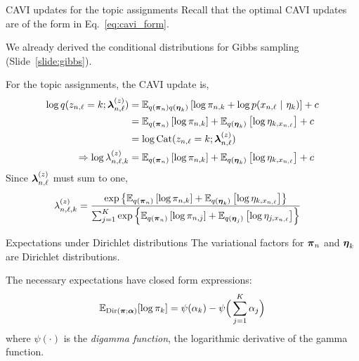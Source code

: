 \documentclass[aspectratio=169]{beamer}
\begin{document}
\begin{frame}{CAVI updates for the topic assignments}
Recall that the optimal CAVI updates are of the form in Eq.~\ref{eq:cavi_form}. 

We already derived the conditional distributions for Gibbs sampling (Slide~\ref{slide:gibbs}).

For the topic assignments, the CAVI update is,
\begin{align}
    \log q(z_{n, \ell} = k; \boldsymbol{\lambda}^{(z)}_{n, \ell}) &=
    \mathbb{E}_{q(\boldsymbol{\pi}_n) q(\boldsymbol{\eta}_k)} \left[ \log \pi_{n, k} + \log p(x_{n, \ell} ~\vert~ \eta_{k}) \right] + c \\
    &= \mathbb{E}_{q(\boldsymbol{\pi}_n)} \left[ \log \pi_{n, k} \right] + \mathbb{E}_{q(\boldsymbol{\eta}_k)} \left[ \log \eta_{k, x_{n, \ell}} \right] + c \\
    &= \log \mathrm{Cat}(z_{n, \ell} = k; \boldsymbol{\lambda}^{(z)}_{n, \ell}) \\
    \Rightarrow \log \lambda_{n,\ell,k}^{(z)} &= \mathbb{E}_{q(\boldsymbol{\pi}_n)} \left[ \log \pi_{n, k} \right] + \mathbb{E}_{q(\boldsymbol{\eta}_k)} \left[ \log \eta_{k, x_{n, \ell}} \right] + c
\end{align}
Since $\boldsymbol{\lambda}_{n,\ell}^{(z)}$ must sum to one,
\begin{align}
\label{eq:q_z_update}
\lambda_{n,\ell,k}^{(z)} &= \frac{\exp\left\{\mathbb{E}_{q(\boldsymbol{\pi}_n)} \left[ \log \pi_{n, k} \right] + \mathbb{E}_{q(\boldsymbol{\eta}_k)} \left[ \log \eta_{k, x_{n, \ell}} \right]\right\}}{\sum_{j=1}^K \exp\left\{\mathbb{E}_{q(\boldsymbol{\pi}_n)} \left[ \log \pi_{n, j} \right] + \mathbb{E}_{q(\boldsymbol{\eta}_j)} \left[ \log \eta_{j, x_{n, \ell}} \right]\right\} }
\end{align}
\end{frame}

\begin{frame}{Expectations under Dirichlet distributions}
The variational factors for $\boldsymbol{\pi}_n$ and $\boldsymbol{\eta}_k$ are Dirichlet distributions. 

The necessary expectations have closed form expressions:
\begin{align}
    \mathbb{E}_{\mathrm{Dir}(\boldsymbol{\pi}; \boldsymbol{\alpha})}[\log \pi_k] = \psi(\alpha_k) - \psi \Big(\sum_{j=1}^K \alpha_j \Big)
\end{align}
where $\psi(\cdot)$ is the \emph{digamma function}, the logarithmic derivative of the gamma function.
\end{frame}
\end{document}

